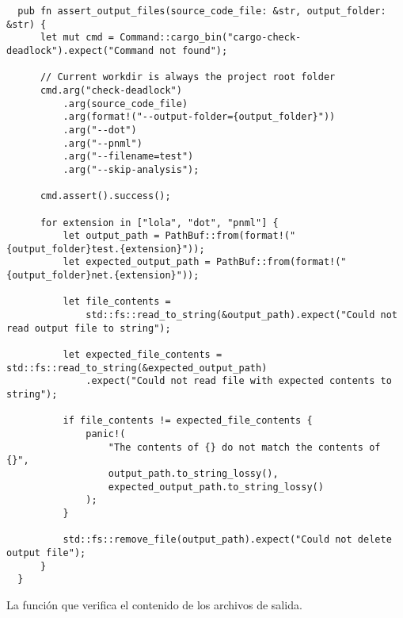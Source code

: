 \begin{listing}[!htbp]
  \begin{verbatim}
  pub fn assert_output_files(source_code_file: &str, output_folder: &str) {
      let mut cmd = Command::cargo_bin("cargo-check-deadlock").expect("Command not found");
  
      // Current workdir is always the project root folder
      cmd.arg("check-deadlock")
          .arg(source_code_file)
          .arg(format!("--output-folder={output_folder}"))
          .arg("--dot")
          .arg("--pnml")
          .arg("--filename=test")
          .arg("--skip-analysis");
  
      cmd.assert().success();
  
      for extension in ["lola", "dot", "pnml"] {
          let output_path = PathBuf::from(format!("{output_folder}test.{extension}"));
          let expected_output_path = PathBuf::from(format!("{output_folder}net.{extension}"));
  
          let file_contents =
              std::fs::read_to_string(&output_path).expect("Could not read output file to string");
  
          let expected_file_contents = std::fs::read_to_string(&expected_output_path)
              .expect("Could not read file with expected contents to string");
  
          if file_contents != expected_file_contents {
              panic!(
                  "The contents of {} do not match the contents of {}",
                  output_path.to_string_lossy(),
                  expected_output_path.to_string_lossy()
              );
          }
  
          std::fs::remove_file(output_path).expect("Could not delete output file");
      }
  }
  \end{verbatim}
  \caption{La función que verifica el contenido de los archivos de salida.}
  \label{lst:assert-output-files}
\end{listing}

